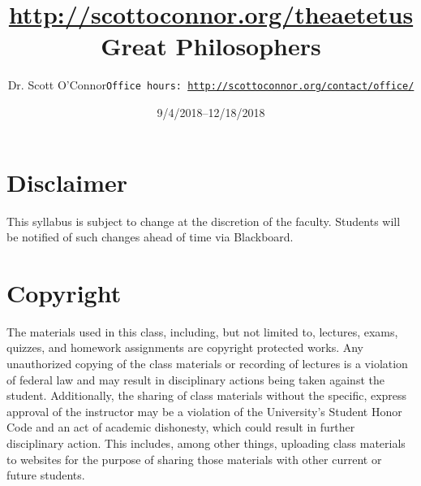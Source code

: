 \documentclass[article,oneside]{memoir}
\def\myauthor{Author}
\def\mytitle{Title}
\def\mycopyright{\myauthor}
\def\myweb{\href{http://scottoconnor.org/theaetetus}{http://scottoconnor.org/theaetetus}}
\def\myauthor{Dr. Scott O'Connor}
\def\mytitle{{\normalsize \myweb \newline} \HUGE Great Philosophers}
\begin{document}
\setsansfont[Mapping=tex-text]{Myriad Pro} 
\setmonofont[Mapping=tex-text,Scale=0.8]{Georgia} 

\def\ind{\hangindent=1 true cm\hangafter=1 \noindent}
\def\labelitemi{$\cdot$}


\title{\LARGE \mytitle}     
\author{\Large\myauthor \newline \footnotesize\texttt{\noindent Office hours: \href{http://scottoconnor.org/contact/office/}{http://scottoconnor.org/contact/office/}}}
\date{9/4/2018--12/18/2018}


\maketitle




%
%


\section{Disclaimer}
 This syllabus is subject to change at the discretion of the faculty. Students will be notified of such changes ahead of time via Blackboard. 

\section{Copyright}
The materials used in this class, including, but not limited to, lectures, exams, quizzes, and homework assignments are copyright protected works.  Any unauthorized copying of the class materials or recording of lectures is a violation of federal law and may result in disciplinary actions being taken against the student.  Additionally, the sharing of class materials without the specific, express approval of the instructor may be a violation of the University's Student Honor Code and an act of academic dishonesty, which could result in further disciplinary action.  This includes, among other things, uploading class materials to websites for the purpose of sharing those materials with other current or future students. 
\end{document}
